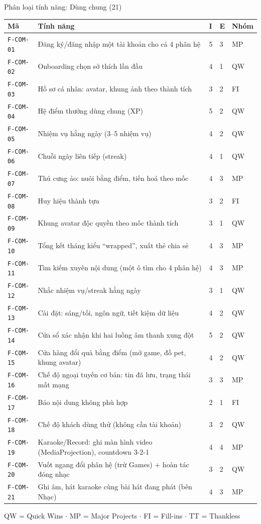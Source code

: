 \begin{frame}{Phân loại tính năng: Dùng chung (21)}
\begin{center}\tiny
\begin{tabular}{@{}p{1.5cm}p{7.5cm}p{0.3cm}p{0.3cm}p{0.8cm}@{}}
\toprule
\textbf{Mã} & \textbf{Tính năng} & \textbf{I} & \textbf{E} & \textbf{Nhóm} \\
\midrule
\texttt{F-COM-01} & Đăng ký/đăng nhập một tài khoản cho cả 4 phân hệ & 5 & 3 & MP \\
\texttt{F-COM-02} & Onboarding chọn sở thích lần đầu & 4 & 1 & QW \\
\texttt{F-COM-03} & Hồ sơ cá nhân: avatar, khung ảnh theo thành tích & 3 & 2 & FI \\
\texttt{F-COM-04} & Hệ điểm thưởng dùng chung (XP) & 5 & 2 & QW \\
\texttt{F-COM-05} & Nhiệm vụ hằng ngày (3--5 nhiệm vụ) & 4 & 2 & QW \\
\texttt{F-COM-06} & Chuỗi ngày liên tiếp (streak) & 4 & 1 & QW \\
\texttt{F-COM-07} & Thú cưng ảo: nuôi bằng điểm, tiến hoá theo mốc & 4 & 3 & MP \\
\texttt{F-COM-08} & Huy hiệu thành tựu & 3 & 2 & FI \\
\texttt{F-COM-09} & Khung avatar độc quyền theo mốc thành tích & 3 & 1 & QW \\
\texttt{F-COM-10} & Tổng kết tháng kiểu ``wrapped'', xuất thẻ chia sẻ & 4 & 3 & MP \\
\texttt{F-COM-11} & Tìm kiếm xuyên nội dung (một ô tìm cho 4 phân hệ) & 4 & 3 & MP \\
\texttt{F-COM-12} & Nhắc nhiệm vụ/streak hằng ngày & 3 & 1 & QW \\
\texttt{F-COM-13} & Cài đặt: sáng/tối, ngôn ngữ, tiết kiệm dữ liệu & 4 & 2 & QW \\
\texttt{F-COM-14} & Cửa sổ xác nhận khi hai luồng âm thanh xung đột & 5 & 2 & QW \\
\texttt{F-COM-15} & Cửa hàng đổi quà bằng điểm (mở game, đồ pet, khung avatar) & 4 & 2 & QW \\
\texttt{F-COM-16} & Chế độ ngoại tuyến cơ bản: tin đã lưu, trạng thái mất mạng & 3 & 3 & MP \\
\texttt{F-COM-17} & Báo nội dung không phù hợp & 2 & 1 & FI \\
\texttt{F-COM-18} & Chế độ khách dùng thử (không cần tài khoản) & 3 & 2 & QW \\
\texttt{F-COM-19} & Karaoke/Record: ghi màn hình video (MediaProjection), countdown 3-2-1 & 4 & 4 & MP \\
\texttt{F-COM-20} & Vuốt ngang đổi phân hệ (trừ Games) + hoàn tác đóng nhạc & 3 & 2 & QW \\
\texttt{F-COM-21} & Ghi âm, hát karaoke cùng bài hát đang phát (bên Nhạc) & 4 & 3 & MP \\
\bottomrule
\end{tabular}
\end{center}
\vfill
{\tiny\color{TextGray} QW = Quick Wins $\cdot$ MP = Major Projects $\cdot$ FI = Fill-ins $\cdot$ TT = Thankless}
\end{frame}

